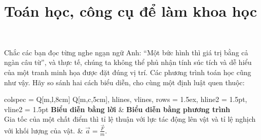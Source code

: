 \section{Toán học, công cụ để làm khoa học}

\ 

Chắc các bạn đọc từng nghe ngạn ngữ Anh: ``Một bức hình thì giá trị bằng cả ngàn câu từ'', và thực tế, chúng ta không thể phủ nhận tính súc tích và dễ hiểu của một tranh minh họa được đặt đúng vị trí. Các phương trình toán học cũng như vậy. Hãy so sánh hai cách biểu diễn, cho cùng một định luật quen thuộc:

\begin{table}[H]
    \centering
    \caption{So sánh định luật biểu diễn bằng lời và bằng phương trình toán}
    \begin{tblr}{
        colspec = {Q[m,l,8cm] Q[m,c,5cm]}, %
        hlines, vlines, %
        rows = {1.5ex}, %
        hline{2} = {1.5pt}, 
        vline{2} = {1.5pt}
    }
        \textbf{Biểu diễn bằng lời} & \textbf{Biểu diễn bằng phương trình} \\
        Gia tốc của một chất điểm thì tỉ lệ thuận với lực tác động lên vật và tỉ lệ nghịch với khối lượng của vật. & 
        $\vec{a} = \frac{\vec{F}}{m}$. \\
    \end{tblr}
\end{table}